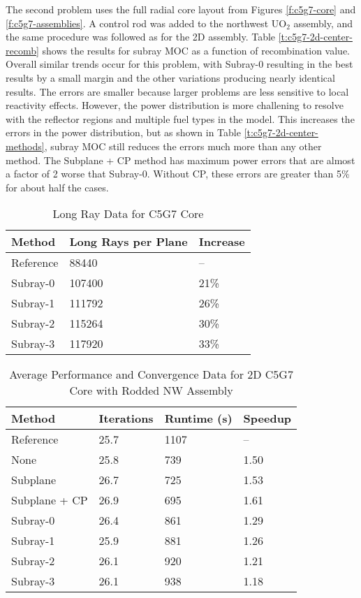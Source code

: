 The second problem uses the full radial core layout from Figures \ref{f:c5g7-core} and \ref{f:c5g7-assemblies}.  A control rod was added to the northwest UO$_2$ assembly, and the same procedure was followed as for the 2D assembly.  Table \ref{t:c5g7-2d-center-recomb} shows the results for subray MOC as a function of recombination value.  Overall similar trends occur for this problem, with Subray-0 resulting in the best results by a small margin and the other variations producing nearly identical results.  The \keff{} errors are smaller because larger problems are less sensitive to local reactivity effects.  However, the power distribution is more challening to resolve with the reflector regions and multiple fuel types in the model.  This increases the errors in the power distribution, but as shown in Table \ref{t:c5g7-2d-center-methods}, subray MOC still reduces the errors much more than any other method.  The Subplane + CP method has maximum power errors that are almost a factor of 2 worse that Subray-0.  Without CP, these errors are greater than 5\% for about half the cases.

\begin{table}[h]
    \centering
    \caption{Long Ray Data for C5G7 Core}\label{t:subray-data-2dcore}
    \begin{tabular}{l l l }\toprule
        Method & Long Rays per Plane & Increase \\\midrule
        Reference & 88440 & -- \\
        Subray-0 & 107400 & 21\% \\
        Subray-1 & 111792 & 26\% \\
        Subray-2 & 115264 & 30\% \\
        Subray-3 & 117920 & 33\% \\
        \bottomrule
    \end{tabular}
\end{table}

\begin{table}[h]
    \centering
    \caption[2D C5G7 Core Performance Data, Center Assembly]{Average Performance and Convergence Data for 2D C5G7 Core with Rodded NW Assembly}\label{t:subray-performance-2dcoreNW}
    \begin{tabular}{l l l l}\toprule
        Method & Iterations & Runtime (s) & Speedup \\\midrule
Reference     & 25.7 & 1107 & --  \\
None          & 25.8 & 739 & 1.50 \\ 
Subplane      & 26.7 & 725 & 1.53 \\ 
Subplane + CP & 26.9 & 695 & 1.61 \\
Subray-0      & 26.4 & 861 & 1.29 \\ 
Subray-1      & 25.9 & 881 & 1.26 \\ 
Subray-2      & 26.1 & 920 & 1.21 \\ 
Subray-3      & 26.1 & 938 & 1.18 \\ 
        \bottomrule
    \end{tabular}
\end{table}

